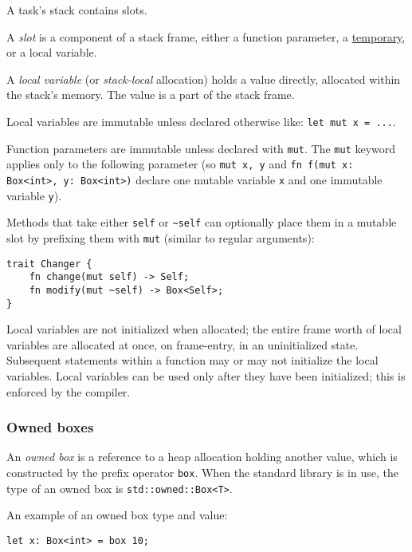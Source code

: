 \documentclass[]{article}
\begin{document}
A task's stack contains slots.

A \emph{slot} is a component of a stack frame, either a function
parameter, a \hyperref[lvaluesux2c-rvalues-and-temporaries]{temporary},
or a local variable.

A \emph{local variable} (or \emph{stack-local} allocation) holds a value
directly, allocated within the stack's memory. The value is a part of
the stack frame.

Local variables are immutable unless declared otherwise like:
\texttt{let mut x = ...}.

Function parameters are immutable unless declared with \texttt{mut}. The
\texttt{mut} keyword applies only to the following parameter (so
\texttt{\textbar{}mut x, y\textbar{}} and
\texttt{fn f(mut x: Box\textless{}int\textgreater{}, y: Box\textless{}int\textgreater{})}
declare one mutable variable \texttt{x} and one immutable variable
\texttt{y}).

Methods that take either \texttt{self} or \texttt{\textasciitilde{}self}
can optionally place them in a mutable slot by prefixing them with
\texttt{mut} (similar to regular arguments):

\begin{verbatim}
trait Changer {
    fn change(mut self) -> Self;
    fn modify(mut ~self) -> Box<Self>;
}
\end{verbatim}

Local variables are not initialized when allocated; the entire frame
worth of local variables are allocated at once, on frame-entry, in an
uninitialized state. Subsequent statements within a function may or may
not initialize the local variables. Local variables can be used only
after they have been initialized; this is enforced by the compiler.

\subsubsection{Owned boxes}\label{owned-boxes}

An \emph{owned box} is a reference to a heap allocation holding another
value, which is constructed by the prefix operator \texttt{box}. When
the standard library is in use, the type of an owned box is
\texttt{std::owned::Box\textless{}T\textgreater{}}.

An example of an owned box type and value:

\begin{verbatim}
let x: Box<int> = box 10;
\end{verbatim}
\end{document}
